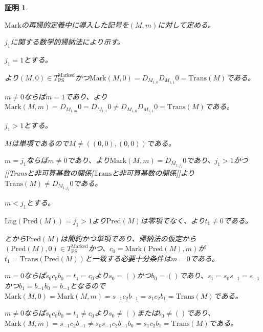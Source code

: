 \documentclass[dvipdfmx,uplatex]{jsarticle}
\theoremstyle{customnonumberbreakfortheorem}
\theoremstyle{customnonumberbreakforproof}
\newtheorem{hideableproof}{証明}
\begin{document}
\begin{hideableproof}
	\begin{indented}
		\item \(\textrm{Mark}\)の再帰的定義中に導入した記号を\((M,m)\)に対して定める。
		\item \(j_1\)に関する数学的帰納法により示す。
		\item \(j_1 = 1\)とする。
		\begin{indented}
			\item {}より\((M,0) \in T_{\textrm{PS}}^{\textrm{Marked}}\)かつ\(\textrm{Mark}(M,0) = D_{M_{1,0}} D_{M_{1,1}} 0 = \textrm{Trans}(M)\)である。
			\item \(m \neq 0\)ならば\(m = 1\)であり、より\(\textrm{Mark}(M,m) = D_{M_{1,m}} 0 = D_{M_{1,1}} 0 \neq D_{M_{1,0}} D_{M_{1,1}} 0 = \textrm{Trans}(M)\)である。
		\end{indented}
		\item \(j_1 > 1\)とする。
		\begin{indented}
			\item \(M\)は単項であるので\(M \neq ((0,0),(0,0))\)である。
			\item \(m = j_1\)ならば\(m \neq 0\)であり、より\(\textrm{Mark}(M,m) = D_{M_{1,j_1}} 0\)であり、\(j_1 > 1\)かつ[[Transと非可算基数の関係|\(\textrm{Trans}\)と非可算基数の関係]]より\(\textrm{Trans}(M) \neq D_{M_{1,j_1}} 0\)である。
			\item \(m < j_1\)とする。
			\begin{indented}
				\item \(\textrm{Lng}(\textrm{Pred}(M)) = j_1 > 1\)より\(\textrm{Pred}(M)\)は零項でなく、より\(t_1 \neq 0\)である。
				\item {}とから\(\textrm{Pred}(M)\)は簡約かつ単項であり、帰納法の仮定から\((\textrm{Pred}(M),0) \in T_{\textrm{PS}}^{\textrm{Marked}}\)かつ、\(c_0 = \textrm{Mark}(\textrm{Pred}(M),m)\)が\(t_1 = \textrm{Trans}(\textrm{Pred}(M))\)と一致する必要十分条件は\(m = 0\)である。
				\item \(m = 0\)ならば\(s_0 c_0 b_0 = t_1 = c_0\)より\(s_0 = ()\)かつ\(b_0 = ()\)であり、\(s_1 = s_0 s_{-1} = s_{-1}\)かつ\(b_1 = b_{-1} b_0 = b_{-1}\)となるので\(\textrm{Mark}(M,0) = \textrm{Mark}(M,m) = s_{-1} c_2 b_{-1} = s_1 c_2 b_1 = \textrm{Trans}(M)\)である。
				\item \(m \neq 0\)ならば\(s_0 c_0 b_0 = t_1 \neq c_0\)より\(s_0 \neq ()\)または\(b_0 \neq ()\)であり、\(\textrm{Mark}(M,m) = s_{-1} c_2 b_{-1} \neq s_0 s_{-1} c_2 b_{-1} b_0 = s_1 c_2 b_1 = \textrm{Trans}(M)\)である。
			\end{indented}
		\end{indented}
	\end{indented}
\end{hideableproof}
\end{document}

